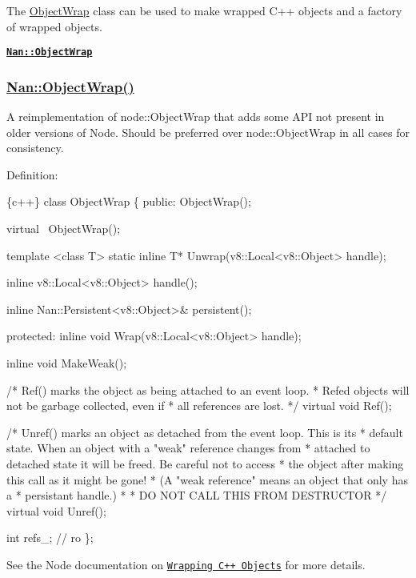 The {\ttfamily \hyperlink{class_object_wrap}{Object\+Wrap}} class can be used to make wrapped C++ objects and a factory of wrapped objects.


\begin{DoxyItemize}
\item \href{#api_nan_object_wrap}{\tt {\bfseries {\ttfamily Nan\+::\+Object\+Wrap}}}
\end{DoxyItemize}

\label{_api_nan_object_wrap}%
 \subsubsection*{\hyperlink{class_nan_1_1_object_wrap}{Nan\+::\+Object\+Wrap()}}

A reimplementation of {\ttfamily node\+::\+Object\+Wrap} that adds some A\+PI not present in older versions of Node. Should be preferred over {\ttfamily node\+::\+Object\+Wrap} in all cases for consistency.

Definition\+:


\begin{DoxyCode}
\{c++\}
class ObjectWrap \{
 public:
  ObjectWrap();

  virtual ~ObjectWrap();

  template <class T>
  static inline T* Unwrap(v8::Local<v8::Object> handle);

  inline v8::Local<v8::Object> handle();

  inline Nan::Persistent<v8::Object>& persistent();

 protected:
  inline void Wrap(v8::Local<v8::Object> handle);

  inline void MakeWeak();

  /* Ref() marks the object as being attached to an event loop.
   * Refed objects will not be garbage collected, even if
   * all references are lost.
   */
  virtual void Ref();

  /* Unref() marks an object as detached from the event loop.  This is its
   * default state.  When an object with a "weak" reference changes from
   * attached to detached state it will be freed. Be careful not to access
   * the object after making this call as it might be gone!
   * (A "weak reference" means an object that only has a
   * persistant handle.)
   *
   * DO NOT CALL THIS FROM DESTRUCTOR
   */
  virtual void Unref();

  int refs\_;  // ro
\};
\end{DoxyCode}


See the Node documentation on \href{https://nodejs.org/api/addons.html#addons_wrapping_c_objects}{\tt Wrapping C++ Objects} for more details.

